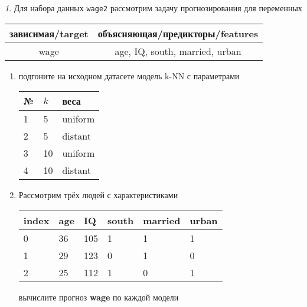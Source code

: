 \documentclass[12pt]{article}
\theoremstyle{remark}
\newtheorem{exercise}{}[section]
\begin{document}
\begin{exercise}
Для набора данных \texttt{wage2} рассмотрим задачу прогнозирования
для переменных
\begin{center}
	\begin{tabular}{|c|c|}\hline
		зависимая/target & объясняющая/предикторы/features \\ \hline
		wage & age, IQ, south, married, urban \\ \hline
	\end{tabular}
\end{center}
\begin{enumerate}
	\item подгоните на исходном датасете модель k-NN с параметрами
	\begin{center}
		\begin{tabular}{|l|l|l|}\hline
		№ & \(k\) & веса \\ \hline
		1 & 5 & uniform \\
		2 & 5 & distant \\
		3 & 10 & uniform \\
		4 & 10 & distant \\ \hline
		\end{tabular}
	\end{center}
	\item Рассмотрим трёх людей с характеристиками
	\begin{center}
		\begin{tabular}{|l||l|l|l|l|l|}\hline
			index & age & IQ & south & married & urban \\ \hline\hline
			0 & 36 & 105 & 1 & 1 & 1 \\
			1 & 29 & 123 & 0 & 1 & 0 \\
			2 & 25 & 112 & 1 & 0 & 1 \\ \hline
		\end{tabular}
	\end{center}
	вычислите прогноз \textbf{wage} по каждой модели
\end{enumerate}
\end{exercise}
\end{document}
